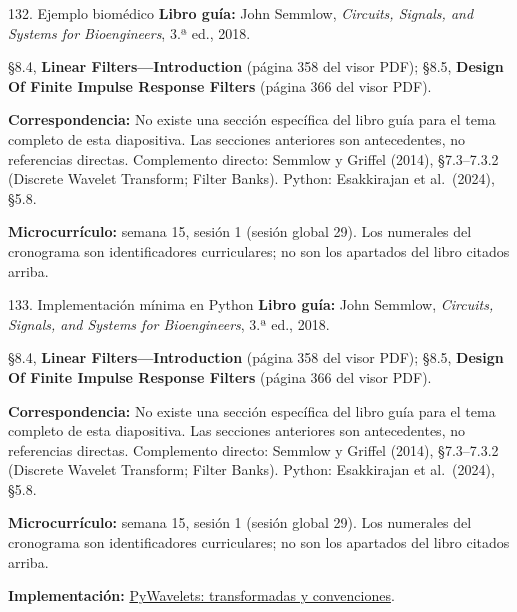 \documentclass[
  10pt,
  ignorenonframetext,
  aspectratio=169,
  spanish,
]{beamer}
\begin{document}
\begin{frame}{132. Ejemplo biomédico}
\label{ejemplo-biomuxe9dico-8}
\textbf{Libro guía:} John Semmlow, \emph{Circuits, Signals, and Systems
for Bioengineers}, 3.ª ed., 2018.

§8.4, \textbf{Linear Filters---Introduction} (página 358 del visor PDF);
§8.5, \textbf{Design Of Finite Impulse Response Filters} (página 366 del
visor PDF).

\textbf{Correspondencia:} No existe una sección específica del libro
guía para el tema completo de esta diapositiva. Las secciones anteriores
son antecedentes, no referencias directas. Complemento directo: Semmlow
y Griffel (2014), §7.3--7.3.2 (Discrete Wavelet Transform; Filter
Banks). Python: Esakkirajan et al.~(2024), §5.8.

\textbf{Microcurrículo:} semana 15, sesión 1 (sesión global 29). Los
numerales del cronograma son identificadores curriculares; no son los
apartados del libro citados arriba.
\end{frame}

\begin{frame}{133. Implementación mínima en Python}
\label{implementaciuxf3n-muxednima-en-python-8}
\textbf{Libro guía:} John Semmlow, \emph{Circuits, Signals, and Systems
for Bioengineers}, 3.ª ed., 2018.

§8.4, \textbf{Linear Filters---Introduction} (página 358 del visor PDF);
§8.5, \textbf{Design Of Finite Impulse Response Filters} (página 366 del
visor PDF).

\textbf{Correspondencia:} No existe una sección específica del libro
guía para el tema completo de esta diapositiva. Las secciones anteriores
son antecedentes, no referencias directas. Complemento directo: Semmlow
y Griffel (2014), §7.3--7.3.2 (Discrete Wavelet Transform; Filter
Banks). Python: Esakkirajan et al.~(2024), §5.8.

\textbf{Microcurrículo:} semana 15, sesión 1 (sesión global 29). Los
numerales del cronograma son identificadores curriculares; no son los
apartados del libro citados arriba.

\textbf{Implementación:}
\href{https://pywavelets.readthedocs.io/en/latest/ref/index.html}{PyWavelets:
transformadas y convenciones}.
\end{frame}
\end{document}

